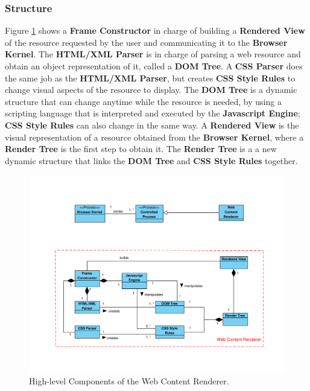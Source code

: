 \documentclass{sig-alternate-05-2015}
\begin{document}
    \subsubsection*{Structure}
    Figure \ref{fig:WCR} shows a \textbf{Frame Constructor} in charge of building a \textbf{Rendered View} of the resource requested by the user and communicating it to the \textbf{Browser Kernel}. The \textbf{HTML/XML Parser} is in charge of parsing a web resource and obtain an object representation of it, called a \textbf{DOM Tree}. A \textbf{CSS Parser} does the same job as the \textbf{HTML/XML Parser}, but creates \textbf{CSS Style Rules} to change visual aspects of the resource to display. The \textbf{DOM Tree} is a dynamic structure that can change anytime while the resource is needed, by using a scripting language that is interpreted and executed by the \textbf{Javascript Engine}; \textbf{CSS Style Rules} can also change in the same way. A \textbf{Rendered View} is the visual representation of a resource obtained from the \textbf{Browser Kernel}, where a \textbf{Render Tree} is the first step to obtain it. The \textbf{Render Tree} is a a new dynamic structure that links the \textbf{DOM Tree} and \textbf{CSS Style Rules} together.

    \begin{figure}[h!t]
    \vspace*{-2cm}
      \centering
      \includegraphics[scale=0.65]{figures/WebContentRenderer.pdf}
      \vspace*{-2.5cm}
      \caption{High-level Components of the Web Content Renderer.}
      \label{fig:WCR}
    \end{figure}
\end{document}
